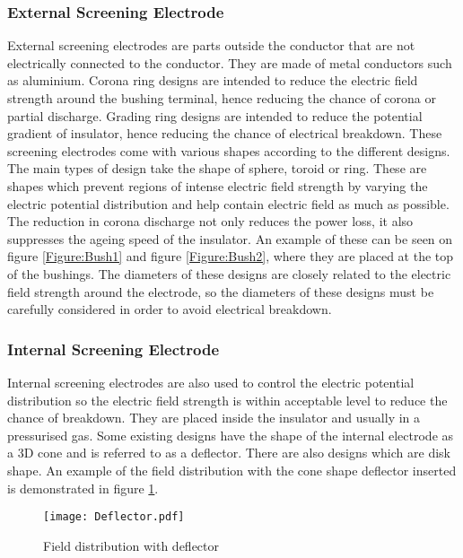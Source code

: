 
\subsubsection{External Screening Electrode}

External screening electrodes are parts outside the conductor that are not electrically connected to the conductor. 
They are made of metal conductors such as aluminium. 
Corona ring designs are intended to reduce the electric field strength around the bushing terminal, hence reducing the chance of corona or partial discharge.
Grading ring designs are intended to reduce the potential gradient of insulator, hence reducing the chance of electrical breakdown. 
These screening electrodes come with various shapes according to the different designs. 
The main types of design take the shape of sphere, toroid or ring. 
These are shapes which prevent regions of intense electric field strength by varying the electric potential distribution and help contain electric field as much as possible. 
The reduction in corona discharge not only reduces the power loss, it also suppresses the ageing speed of the insulator. 
An example of these can be seen on figure \ref{Figure:Bush1} and figure \ref{Figure:Bush2}, where they are placed at the top of the bushings. 
The diameters of these designs are closely related to the electric field strength around the electrode, so the diameters of these designs must be carefully considered in order to avoid electrical breakdown.

\subsubsection{Internal Screening Electrode}

Internal screening electrodes are also used to control the electric potential distribution so the electric field strength is within acceptable level to reduce the chance of breakdown. 
They are placed inside the insulator and usually in a pressurised gas. 
Some existing designs have the shape of the internal electrode as a 3D cone and is referred to as a deflector.
There are also designs which are disk shape. 
An example of the field distribution with the cone shape deflector inserted is demonstrated in figure \ref{figure:deflector}.

\begin{figure}[!h]
   \centering
   \texttt{[image: Deflector.pdf]}
   \caption{Field distribution with deflector}
   \label{figure:deflector}
\end{figure}

